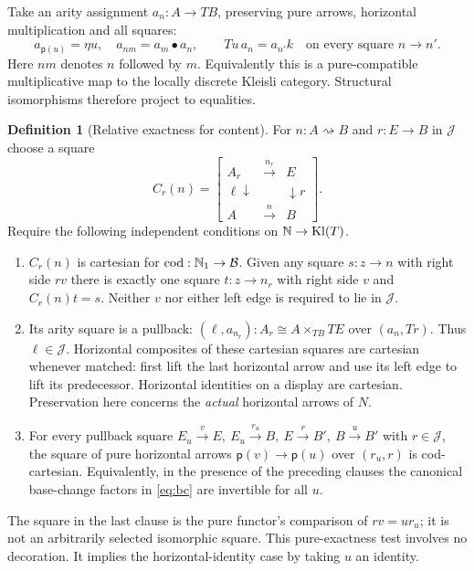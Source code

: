 \documentclass[11pt]{article}
\theoremstyle{definition}\newtheorem{definition}[theorem]{Definition}
\newcommand{\B}{\mathcal B}\newcommand{\J}{\mathcal J}
\newcommand{\cod}{\mathrm{cod}}\newcommand{\iso}{\xrightarrow{\ \sim\ }}
\newcommand{\pure}{\mathsf{p}}\newcommand{\grade}{\mathsf G}
\begin{document}
Take an arity assignment $a_n:A\to TB$, preserving pure arrows,
horizontal multiplication and all squares:
\[
 a_{\pure(u)}=\eta u,\quad a_{nm}=a_m\bullet a_n,\qquad
 Tu\,a_n=a_{n'} k\quad\text{on every square } n\to n'.
 \tag{A}\label{eq:arity}
\]
Here $nm$ denotes $n$ followed by $m$. Equivalently this is a
pure-compatible multiplicative map to the locally discrete Kleisli
category. Structural isomorphisms therefore project to equalities.

\begin{definition}[Relative exactness for content]\label{def:corner}
For $n:A\rightsquigarrow B$ and $r:E\to B$ in $\J$ choose a square
\[
 C_r(n)=
 \left[
 \begin{array}{ccc}
 A_r&\xrightarrow{\ n_r\ }&E\\[-2pt]
 {\scriptstyle\ell}\downarrow&&\downarrow{\scriptstyle r}\\[-2pt]
 A&\xrightarrow{\ n\ }&B
 \end{array}\right].
\]
Require the following independent conditions on $\mathbb N\to\mathrm{Kl}(T)$.
\begin{enumerate}
\item $C_r(n)$ is cartesian for $\cod:\N_1\to\B$. Given any square
$s:z\to n$ with right side $rv$ there is exactly one square
$t:z\to n_r$ with right side $v$ and $C_r(n)t=s$.
Neither $v$ nor either left edge is required to lie in $\J$.
\item Its arity square is a pullback:
$(\ell,a_{n_r}):A_r\cong A\times_{TB} TE$ over $(a_n,Tr)$.
Thus $\ell\in\J$. Horizontal composites of these cartesian squares
are cartesian whenever matched: first lift the last horizontal
arrow and use its left edge to lift its predecessor.
Horizontal identities on a display are cartesian.
Preservation here concerns the \emph{actual} horizontal arrows of $N$.
\item For every pullback square
$E_u\xrightarrow{v}E,\ E_u\xrightarrow{r_u}B,\ E\xrightarrow r B',
\ B\xrightarrow u B'$ with $r\in\J$, the square of pure horizontal
arrows $\pure(v)\to\pure(u)$ over $(r_u,r)$ is cod-cartesian.
Equivalently, in the presence of the preceding clauses the canonical
base-change factors in \eqref{eq:bc} are invertible for all $u$.
\end{enumerate}
The square in the last clause is the pure functor's comparison of
$r v=u r_u$; it is not an arbitrarily selected isomorphic square.
This pure-exactness test involves no decoration. It implies the
horizontal-identity case by taking $u$ an identity.
\end{definition}
\end{document}
